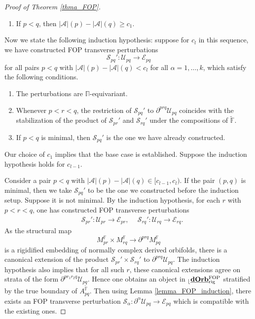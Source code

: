 \documentclass[reqno, 10pt]{amsart}
\numberwithin{equation}{section}
\numberwithin{equation}{section}
\theoremstyle{definition}
\theoremstyle{remark}
\newcommand{\beqn}{\begin{equation*}}
\newcommand{\eeqn}{\end{equation*}}
\newcommand{\mb}{\mathbb}
\newcommand{\mc}{\mathcal}
\renewcommand{\outer}{{}_{\lfloor}}
\newcommand{\uds}[1]{\underline{\smash{#1}}}
\begin{document}
\begin{proof}[Proof of Theorem \ref{thma_FOP}]
\begin{enumerate}
    \item If $p<q$, then $|{\mc A}| (p)  - |{\mc A}| (q) \geq c_1$. 
\end{enumerate}

Now we state the following induction hypothesis: suppose for $c_l$ in this sequence, we have constructed FOP transverse perturbations
\beqn
{\mc S}_{pq}': {\mc U}_{pq} \to {\mc E}_{pq}
\eeqn
for all pairs $p<q$ with $| {\mc A} |(p) - |{\mc A}| (q) < c_l$ for all $\alpha = 1, \ldots, k$, which satisfy the following conditions.
\begin{enumerate}

\item The perturbations are $\mb\Pi$-equivariant.

\item Whenever $p<r<q$, the restriction of ${\mc S}_{pq}'$ to $\partial^{prq} {\mc U}_{pq}$ coincides with the stabilization of the product of ${\mc S}_{pr}'$ and ${\mc S}_{rq}'$ under the compositions of $\tilde {\mb F}$. 

\item If $p<q$ is minimal, then ${\mc S}_{pq}'$ is the one we have already constructed.
\end{enumerate}

Our choice of $c_1$ implies that the base case is established. Suppose the induction hypothesis holds for $c_{l-1}$. 

Consider a pair $p<q$ with $| {\mc A} | (p) - | {\mc A} | (q) \in [c_{l-1}, c_l)$. If the pair $(p, q)$ is minimal, then we take ${\mc S}_{pq}'$ to be the one we constructed before the induction setup. Suppose it is not minimal. By the induction hypothesis, for each $r$ with $p<r<q$, one has constructed FOP transverse perturbations
\begin{align*}
&\ {\mc S}_{pr}': {\mc U}_{pr} \to {\mc E}_{pr},\ &\ {\mc S}_{rq}': {\mc U}_{rq} \to {\mc E}_{rq}.
\end{align*}
As the structural map
\beqn
M_{pr}^{\mb F} \times M_{rq}^{\mb F} \to \partial^{prq} M_{pq}^{\mb F}
\eeqn
is a rigidified embedding of normally complex derived orbifolds, there is a canonical extension of the product ${\mc S}_{pr}'\times {\mc S}_{rq}'$ to $\partial^{prq} {\mc U}_{pq}$. The induction hypothesis also implies that for all such $r$, these canonical extensions agree on strata of the form $\partial^{pr_1 r_2 q} {\mc U}_{pq}$. Hence one obtains an object in $\outer \uds{\bf dOrb}_{\rm rig}^{\rm FOP}$ stratified by the true boundary of $A_{pq}^{\tilde {\mb F}}$. Then using Lemma \ref{lemma_FOP_induction}, there exists an FOP transverse perturbation ${\mc S}_\alpha: \partial^\alpha {\mc U}_{pq} \to {\mc E}_{pq}$ which is compatible with the existing ones. 


\end{proof}
\end{document}
